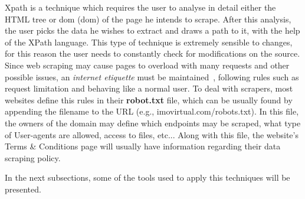 Xpath is a technique which requires the user to analyse in detail either the HTML tree or \acrlong{dom} (\acrshort{dom}) of the page he intends to scrape. After this analysis, the user picks the data he wishes to extract and draws a path to it, with the help of the XPath language. This type of technique is extremely sensible to changes, for this reason the user needs to constantly check for modifications on the source. \\

Since web scraping may cause pages to overload with many requests and other possible issues, an \textit{internet etiquette} must be maintained~\cite{6623484}, following rules such as request limitation and behaving like a normal user. To deal with scrapers, most websites define this rules in their \textbf{robot.txt} file, which can be usually found by appending the filename to the URL (e.g., imovirtual.com/robots.txt). In this file, the owners of the domain may define which endpoints may be scraped, what type of User-agents are allowed, access to files, etc... Along with this file, the website's Terms \& Conditions page will usually have information regarding their data scraping policy.

In the next subsections, some of the tools used to apply this techniques will be presented.





